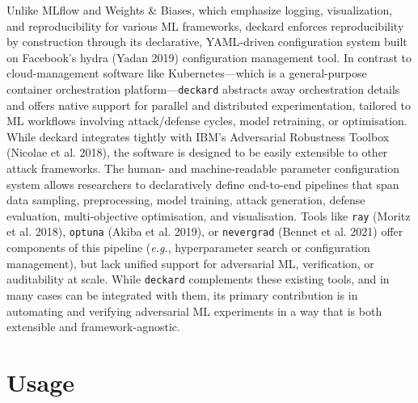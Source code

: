 \documentclass[
]{article}
\begin{document}
Unlike MLflow and Weights \& Biases, which emphasize logging,
visualization, and reproducibility for various ML frameworks, deckard
enforces reproducibility by construction through its declarative,
YAML-driven configuration system built on Facebook's hydra (Yadan 2019)
configuration management tool. In contrast to cloud-management software
like Kubernetes---which is a general-purpose container orchestration
platform---\texttt{deckard} abstracts away orchestration details and
offers native support for parallel and distributed experimentation,
tailored to ML workflows involving attack/defense cycles, model
retraining, or optimisation. While deckard integrates tightly with IBM's
Adversarial Robustness Toolbox (Nicolae et al. 2018), the software is
designed to be easily extensible to other attack frameworks. The human-
and machine-readable parameter configuration system allows researchers
to declaratively define end-to-end pipelines that span data sampling,
preprocessing, model training, attack generation, defense evaluation,
multi-objective optimisation, and visualisation. Tools like \texttt{ray}
(Moritz et al. 2018), \texttt{optuna} (Akiba et al. 2019), or
\texttt{nevergrad} (Bennet et al. 2021) offer components of this
pipeline (\emph{e.g.}, hyperparameter search or configuration
management), but lack unified support for adversarial ML, verification,
or auditability at scale. While \texttt{deckard} complements these
existing tools, and in many cases can be integrated with them, its
primary contribution is in automating and verifying adversarial ML
experiments in a way that is both extensible and framework-agnostic.

\hypertarget{usage}{%
\section{Usage}\label{usage}}
\end{document}
